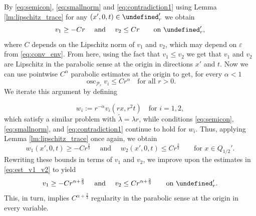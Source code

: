 \documentclass[12pt]{article}
\makeatletter
\let\P\undefined
\newenvironment{customproof}[1]{%
  \par\pushQED{\qed}%
  \normalfont\topsep6pt \trivlist
  \item[\hskip\labelsep\itshape
    Proof of #1\@addpunct{.}]\ignorespaces
}{%
  \popQED\endtrivlist\@endpefalse
}
\numberwithin{Theorem}{section}
\theoremstyle{definition}
\theoremstyle{remark}
\numberwithin{equation}{section}
\newcommand{\osc}{\operatorname{osc}}
\newcommand{\P}{\mathcal{P}}
\makeatother
\begin{document}
\begin{customproof}{Theorem \ref{Thm:CP}}
By \eqref{eq:semicon}, \eqref{eq:smallnorm} and \eqref{eq:contradiction1} using Lemma \ref{lm:lipschitz_trace} for any $(x',0,t) \in \P'_r$ we obtain
\begin{equation} \label{eq:est_v1_v2}
v_1 \geq  -Cr \quad \text{ and }\quad  v_2 \leq Cr \qquad \text{on } \P_r',
 \end{equation}
 where $C$ depends on the Lipschitz norm of $v_1$ and $v_2$, which may depend on $\varepsilon$ from \eqref{eq:conv_env}. From here, using the fact that $v_1\leq v_2$ we get that
  $v_1$ and $v_2$ are Lipschitz in the parabolic sense at the origin in directions $x'$ and $t$. Now we can use pointwise $C^{ \alpha}$ parabolic estimates at the origin to get, for every ${ \alpha}<1$
 \[
 \osc_{\mathcal{P}_r}v_i\leq Cr^{ \alpha} \quad \text{for all }r>0.
 \]
We iterate this argument by defining

\[
w_i:= r^{-{ \alpha}} v_i(rx,r^2 t) \quad \text{for }i=1,2,
\]
which satisfy a similar problem with $\tilde \lambda= \lambda r$, while conditions \eqref{eq:semicon}, \eqref{eq:smallnorm}, and \eqref{eq:contradiction1} continue to hold for $w_i$. Thus, applying Lemma \ref{lm:lipschitz_trace} once again, we obtain
\[
w_1(x',0,t) \geq  -Cr^{\frac 2 3} \quad \text{ and }\quad  w_2(x',0,t) \leq Cr^{ \frac 2 3} \qquad \text{for } x \in Q_{1/2}'.
\]
Rewriting these bounds in terms of $v_1$ and $v_2$, we improve upon the estimates in \eqref{eq:est_v1_v2} to yield
\begin{equation} \label{eq:est_v1_v2_2}
    v_1 \geq  -Cr^{{ \alpha}+ \frac 2 3} \quad \text{ and }\quad  v_2 \leq Cr^{{ \alpha}+ \frac 2 3} \qquad \text{on } \P_r'.
\end{equation}
This, in turn, implies $C^{{ \alpha}+\frac{2}{3}}$ regularity in the parabolic sense at the origin in every variable.


\end{customproof}
\end{document}
